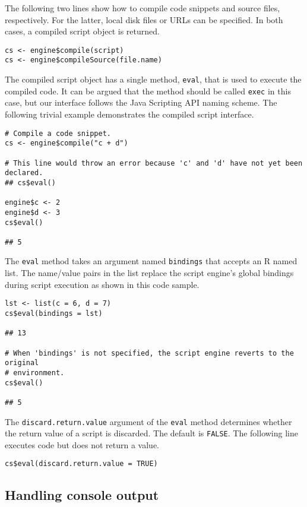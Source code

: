 \documentclass[
article,
11pt, %
a4paper, %
oneside, %
headinclude,footinclude, %
]{scrartcl}
\theoremstyle{definition} %
\theoremstyle{plain} %
\theoremstyle{remark} %
\newcommand{\code}[1]{\texttt{#1}}
\begin{document}
The following two lines show how to compile code snippets and source files, respectively. For the latter, local disk files or URLs can be specified. In both cases, a compiled script object is returned.

\begin{verbatim}
cs <- engine$compile(script)
cs <- engine$compileSource(file.name)
\end{verbatim}

The compiled script object has a single method, \code{eval}, that is used to execute the compiled code. It can be argued that the method should be called \code{exec} in this case, but our interface follows the Java Scripting API naming scheme. The following trivial example demonstrates the compiled script interface.

\begin{verbatim}
# Compile a code snippet.
cs <- engine$compile("c + d")

# This line would throw an error because 'c' and 'd' have not yet been declared.
## cs$eval()

engine$c <- 2
engine$d <- 3
cs$eval()

## 5
\end{verbatim}

The \code{eval} method takes an argument named \code{bindings} that accepts an R named list. The name/value pairs in the list replace the script engine's global bindings during script execution as shown in this code sample.
\begin{verbatim}
lst <- list(c = 6, d = 7)
cs$eval(bindings = lst)

## 13

# When 'bindings' is not specified, the script engine reverts to the original
# environment.
cs$eval()

## 5
\end{verbatim}

The \code{discard.return.value} argument of the \code{eval} method determines whether the return value of a script is discarded. The default is \code{FALSE}. The following line executes code but does not return a value.
\begin{verbatim}
cs$eval(discard.return.value = TRUE)
\end{verbatim}

\subsection{Handling console output}
\end{document}
